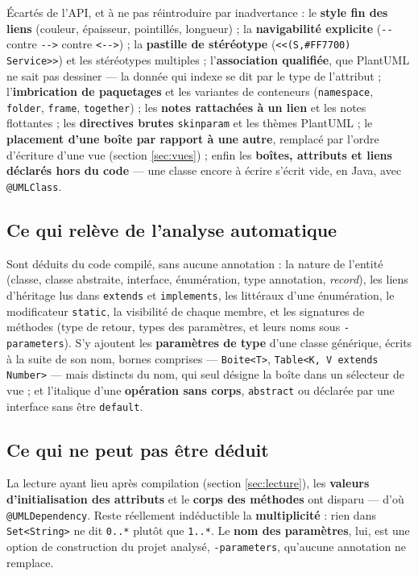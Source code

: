 \documentclass[12pt, a4paper]{article}
\begin{document}
Écartés de l'API, et à ne pas réintroduire par inadvertance : le \textbf{style fin des liens} (couleur, épaisseur, pointillés, longueur) ; la \textbf{navigabilité explicite} (\texttt{-{}-} contre \texttt{-{}->} contre \texttt{<-{}->}) ; la \textbf{pastille de stéréotype} (\texttt{<<(S,\#FF7700) Service>>}) et les stéréotypes multiples ; l'\textbf{association qualifiée}, que PlantUML ne sait pas dessiner --- la donnée qui indexe se dit par le type de l'attribut ; l'\textbf{imbrication de paquetages} et les variantes de conteneurs (\texttt{namespace}, \texttt{folder}, \texttt{frame}, \texttt{together}) ; les \textbf{notes rattachées à un lien} et les notes flottantes ; les \textbf{directives brutes} \texttt{skinparam} et les thèmes PlantUML ; le \textbf{placement d'une boîte par rapport à une autre}, remplacé par l'ordre d'écriture d'une vue (section \ref{sec:vues}) ; enfin les \textbf{boîtes, attributs et liens déclarés hors du code} --- une classe encore à écrire s'écrit vide, en Java, avec \texttt{@UMLClass}.

\subsection{Ce qui relève de l'analyse automatique}
Sont déduits du code compilé, sans aucune annotation : la nature de l'entité (classe, classe abstraite, interface, énumération, type annotation, \textit{record}), les liens d'héritage lus dans \texttt{extends} et \texttt{implements}, les littéraux d'une énumération, le modificateur \texttt{static}, la visibilité de chaque membre, et les signatures de méthodes (type de retour, types des paramètres, et leurs noms sous \texttt{-parameters}). S'y ajoutent les \textbf{paramètres de type} d'une classe générique, écrits à la suite de son nom, bornes comprises --- \texttt{Boite<T>}, \texttt{Table<K, V extends Number>} --- mais distincts du nom, qui seul désigne la boîte dans un sélecteur de vue ; et l'italique d'une \textbf{opération sans corps}, \texttt{abstract} ou déclarée par une interface sans être \texttt{default}.

\subsection{Ce qui ne peut pas être déduit}
La lecture ayant lieu après compilation (section \ref{sec:lecture}), les \textbf{valeurs d'initialisation des attributs} et le \textbf{corps des méthodes} ont disparu --- d'où \texttt{@UMLDependency}. Reste réellement indéductible la \textbf{multiplicité} : rien dans \texttt{Set<String>} ne dit \texttt{0..*} plutôt que \texttt{1..*}. Le \textbf{nom des paramètres}, lui, est une option de construction du projet analysé, \texttt{-parameters}, qu'aucune annotation ne remplace.
\end{document}
